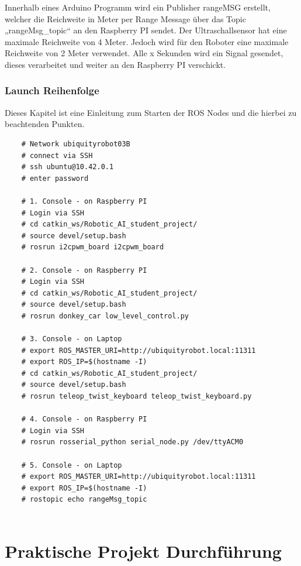 \documentclass[conference]{IEEEtran}
\begin{document}
    Innerhalb eines Arduino Programm wird ein Publisher rangeMSG erstellt, welcher die Reichweite in Meter per Range Message über das Topic „rangeMsg\_topic“ an den Raspberry PI sendet. 
    Der Ultraschallsensor hat eine maximale Reichweite von 4 Meter. Jedoch wird für den Roboter eine maximale Reichweite von 2 Meter verwendet. Alle x Sekunden wird ein Signal gesendet, dieses verarbeitet und weiter an den Raspberry PI verschickt.
    
	\subsubsection{Launch Reihenfolge}%
	
	Dieses Kapitel ist eine Einleitung zum Starten der ROS Nodes und die hierbei zu beachtenden Punkten.
	
	
    \begin{lstlisting}
    # Network ubiquityrobot03B
    # connect via SSH
    # ssh ubuntu@10.42.0.1
    # enter password
    
    # 1. Console - on Raspberry PI
    # Login via SSH
    # cd catkin_ws/Robotic_AI_student_project/
    # source devel/setup.bash
    # rosrun i2cpwm_board i2cpwm_board
    
    # 2. Console - on Raspberry PI
    # Login via SSH
    # cd catkin_ws/Robotic_AI_student_project/
    # source devel/setup.bash
    # rosrun donkey_car low_level_control.py
    
    # 3. Console - on Laptop 
    # export ROS_MASTER_URI=http://ubiquityrobot.local:11311
    # export ROS_IP=$(hostname -I)
    # cd catkin_ws/Robotic_AI_student_project/
    # source devel/setup.bash
    # rosrun teleop_twist_keyboard teleop_twist_keyboard.py
    
    # 4. Console - on Raspberry PI
    # Login via SSH
    # rosrun rosserial_python serial_node.py /dev/ttyACM0
    
    # 5. Console - on Laptop
    # export ROS_MASTER_URI=http://ubiquityrobot.local:11311
    # export ROS_IP=$(hostname -I)
    # rostopic echo rangeMsg_topic
    
    \end{lstlisting}

	
	\section{Praktische Projekt Durchführung}
	
\end{document}
